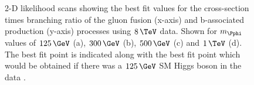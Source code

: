 \begin{figure}[tbh]

\caption[2-D likelihood scans showing the best fit values for the cross-section
times branching ratio of the gluon fusion (x-axis) and b-associated production
(y-axis) processes using $8\,\TeV$ data.]{2-D likelihood scans showing the best fit values for the cross-section
times branching ratio of the gluon fusion (x-axis) and b-associated production
(y-axis) processes using $8\,\TeV$ data. Shown for $m_{\Pphi}$ values of
$125\,\GeV$ (a), $300\,\GeV$ (b), $500\,\GeV$ (c) and
$1\,\TeV$ (d). The best fit point is indicated along with the best fit
point which would be obtained if there was a $125\,\GeV$ \ac{SM} Higgs boson in the data \cite{HIG-13-021}.}
\label{fig:2Dlikelihood}
\end{figure}

